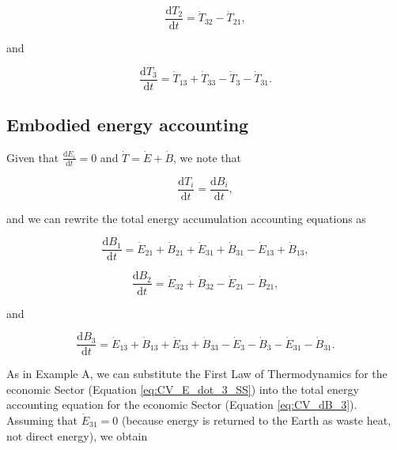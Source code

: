 \documentclass[authoryear,preprint,review,12pt]{elsarticle}
\begin{document}
\begin{equation} \label{eq:CV_T_2}
	\frac{\mathrm{d}T_{2}}{\mathrm{d}t} 	 = \dot{T}_{32} - \dot{T}_{21},
\end{equation}

\noindent and

\begin{equation} \label{eq:CV_T_3}
	\frac{\mathrm{d}T_{3}}{\mathrm{d}t} 	 = \dot{T}_{13} + \dot{T}_{33} - \dot{T}_{3} - \dot{T}_{31}.
\end{equation}

\subsection{Embodied energy accounting}

Given that $\frac{\mathrm{d}E_{i}}{\mathrm{d}t} = 0$ and $\dot{T} = \dot{E} + \dot{B}$, we note that

\begin{equation} \label{eq:T_dot_equals_B_dot}
	\frac{\mathrm{d}T_i}{\mathrm{d}t} = \frac{\mathrm{d}B_i}{\mathrm{d}t},
\end{equation}

\noindent and we can rewrite the total energy accumulation accounting equations as

\begin{equation} \label{eq:CV_dB_1}
	\frac{\mathrm{d}B_{1}}{\mathrm{d}t} = \dot{E}_{21} + \dot{B}_{21} + \dot{E}_{31} + \dot{B}_{31} - \dot{E}_{13} + \dot{B}_{13},
\end{equation}

\begin{equation} \label{eq:CV_dB_2}
	\frac{\mathrm{d}B_{2}}{\mathrm{d}t} = \dot{E}_{32} + \dot{B}_{32} - \dot{E}_{21} - \dot{B}_{21},
\end{equation}

\noindent and 

\begin{equation} \label{eq:CV_dB_3}
	\frac{\mathrm{d}B_{3}}{\mathrm{d}t} = \dot{E}_{13} + \dot{B}_{13} + \dot{E}_{33} + \dot{B}_{33} - \dot{E}_{3} - \dot{B}_{3} - \dot{E}_{31} - \dot{B}_{31}.
\end{equation}

As in Example A, we can substitute the First Law of Thermodynamics for the economic Sector (Equation \ref{eq:CV_E_dot_3_SS}) into the total energy accounting equation for the economic Sector (Equation \ref{eq:CV_dB_3}). Assuming that $\dot{E}_{31} = 0$ (because energy is returned to the Earth as waste heat, not direct energy), we obtain
\end{document}
